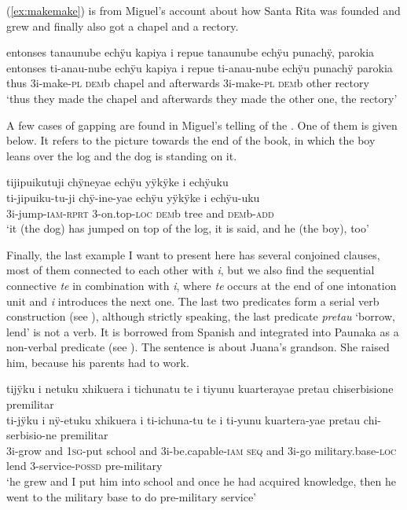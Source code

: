 (\ref{ex:makemake}) is from Miguel’s account about how Santa Rita was founded and grew and finally also got a chapel and a rectory.

\ea\label{ex:makemake}
\begingl
\glpreamble entonses tanaunube echÿu kapiya i repue tanaunube echÿu punachÿ, parokia\\
\gla entonses ti-anau-nube echÿu kapiya i repue ti-anau-nube echÿu punachÿ parokia\\
\glb thus 3i-make-\textsc{pl} \textsc{dem}b chapel and afterwards 3i-make-\textsc{pl} \textsc{dem}b other rectory\\
\glft ‘thus they made the chapel and afterwards they made the other one, the rectory’
\endgl
\trailingcitation{[mxx-p110825l.131]}
\xe

A few cases of gapping are found in Miguel’s telling of the . One of them is given below. It refers to the picture towards the end of the book, in which the boy leans over the log and the dog is standing on it. 

\newpage
\ea\label{ex:ellipsis}
\begingl
\glpreamble tijipuikutuji chÿneyae echÿu yÿkÿke i echÿuku\\
\gla ti-jipuiku-tu-ji chÿ-ine-yae echÿu yÿkÿke i echÿu-uku\\
\glb 3i-jump-\textsc{iam}-\textsc{rprt} 3-on.top-\textsc{loc} \textsc{dem}b tree and \textsc{dem}b-\textsc{add}\\
\glft ‘it (the dog) has jumped on top of the log, it is said, and he (the boy), too’
\endgl
\trailingcitation{[mtx-a110906l.207-210]}
\xe 

Finally, the last example I want to present here has several conjoined clauses, most of them connected to each other with \textit{i}, but we also find the sequential connective \textit{te} in combination with \textit{i}, where \textit{te} occurs at the end of one intonation unit and \textit{i} introduces the next one. The last two predicates form a serial verb construction (see ), although strictly speaking, the last predicate \textit{pretau} ‘borrow, lend’ is not a verb. It is borrowed from Spanish and integrated into Paunaka as a non-verbal predicate (see ). The sentence is about Juana’s grandson. She raised him, because his parents had to work.

\ea
\begingl
\glpreamble tijÿku i netuku xhikuera i tichunatu te i tiyunu kuarterayae pretau chiserbisione premilitar\\
\gla ti-jÿku i nÿ-etuku xhikuera i ti-ichuna-tu te i ti-yunu kuartera-yae pretau chi-serbisio-ne premilitar\\
\glb 3i-grow and 1\textsc{sg}-put school and 3i-be.capable-\textsc{iam} \textsc{seq} and 3i-go military.base-\textsc{loc} lend 3-service-\textsc{possd} pre-military\\
\glft ‘he grew and I put him into school and once he had acquired knowledge, then he went to the military base to do pre-military service’
\endgl
\trailingcitation{[jxx-p110923l-1.173-178]}
\xe



